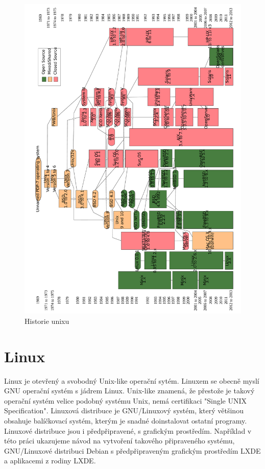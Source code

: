 \documentclass[thesis=M,czech]{FITthesis}[2012/06/26]
\begin{document}
\begin{figure}
	\includegraphics[width=1.0\textwidth]{./images/Unix_history-simple_rot_big}
	\caption{Historie unixu}
	\label{fig:unixhistory}
\end{figure}



\section{Linux}
Linux je otevřený a svobodný Unix-like operační sytém. Linuxem se obecně myslí GNU operační systém s jádrem Linux. Unix-like znamená, že přestože je takový operační systém velice podobný systému Unix, nemá certifikaci "Single UNIX Specification". Linuxová distribuce je GNU/Linuxový systém, který většinou obsahuje balíčkovací systém, kterým je snadné doinstalovat ostatní programy. Linuxové distribuce jsou i předpřipravené, s grafickým prostředím. Například v této práci ukazujeme návod na vytvoření takového připraveného systému, GNU/Linuxové distribuci Debian s předpřipraveným grafickým prostředím LXDE a aplikacemi z rodiny LXDE.
\end{document}
